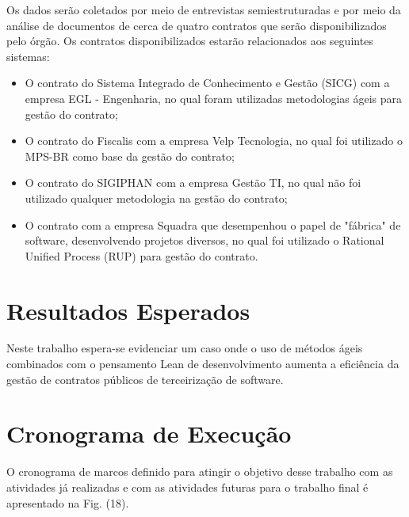 Os dados serão coletados por meio de entrevistas semiestruturadas e por meio da análise de documentos de cerca de quatro contratos que serão disponibilizados pelo órgão. Os contratos disponibilizados estarão relacionados aos seguintes sistemas:
\begin{itemize}
\item  O contrato do Sistema Integrado de Conhecimento e Gestão (SICG) com a empresa EGL - Engenharia, no qual foram utilizadas metodologias ágeis para gestão do contrato;
\item  O contrato do Fiscalis com a empresa Velp Tecnologia, no qual foi utilizado o MPS-BR como base da gestão do contrato;
\item  O contrato do SIGIPHAN com a empresa Gestão TI, no qual não foi utilizado qualquer metodologia na gestão do contrato;
\item  O contrato com a empresa Squadra que desempenhou o papel de "fábrica" de software, desenvolvendo projetos diversos, no qual foi utilizado o Rational Unified Process (RUP) para gestão do contrato.
\end{itemize}

\section[Resultados Esperados]{Resultados Esperados}

Neste trabalho espera-se evidenciar um caso onde o uso de métodos ágeis combinados com o pensamento Lean de desenvolvimento aumenta a eficiência da gestão de contratos públicos de terceirização de software.

\section[Cronograma de Execução]{Cronograma de Execução}

O cronograma de marcos definido para atingir o objetivo desse trabalho com as atividades já realizadas e com as atividades futuras para o trabalho final é apresentado na Fig. (18). 

